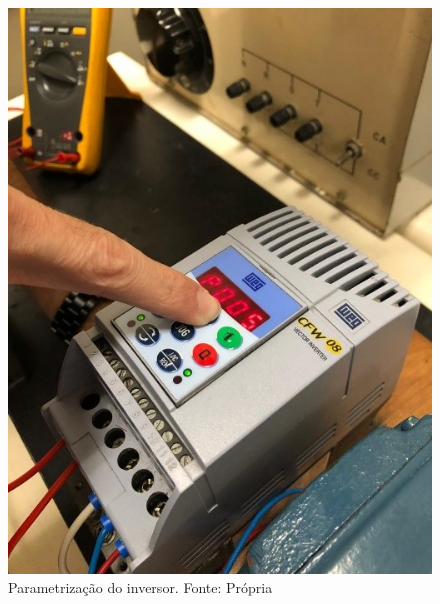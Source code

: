 \documentclass[a4paper, 12pt,oneside, english, brazil]{abntex2}
\begin{document}
\begin{figure}[H]
    \centering
    \includegraphics[scale=1.0]{parametr.jpg}
    \caption{Parametrização do inversor. Fonte: Própria}
    \label{haha}
\end{figure}
\end{document}

